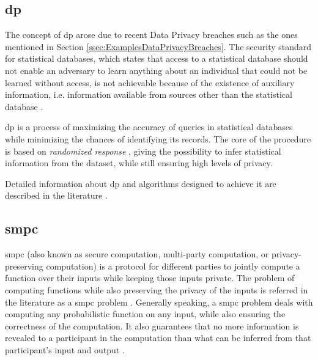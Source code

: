 \subsection{\acl{dp}}
\label{ssec:DifferentialPrivacy}


The concept of \acf{dp} arose due to recent Data Privacy breaches such as the ones mentioned in Section \ref{ssec:ExamplesDataPrivacyBreaches}. The security standard for statistical databases, which states that access to a statistical database should not enable an adversary to learn anything about an individual that could not be learned without access, is not achievable because of the existence of auxiliary information, i.e. information available from sources other than the statistical database \cite{Dwork2006}.

\ac{dp} is a process of maximizing the accuracy of queries in statistical databases while minimizing the chances of identifying its records. The core of the procedure is based on \textit{randomized response} \cite{warner1965randomized}, giving the possibility to infer statistical information from the dataset, while still ensuring high levels of privacy.

Detailed information about \ac{dp} and algorithms designed to achieve it are described in the literature \cite{dwork2014algorithmic}.


\subsection{\acl{smpc}} 
\label{ssec:SecureMultiPartyComputation}


\acf{smpc} (also known as secure computation, multi-party computation, or privacy-preserving computation) is a protocol for different parties to jointly compute a function over their inputs while keeping those inputs private. The problem of computing functions while also preserving the privacy of the inputs is referred in the literature as a \ac{smpc} problem \cite{yao1982protocols}. Generally speaking, a \ac{smpc} problem deals with computing any probabilistic function on any input, while also ensuring the correctness of the computation. It also guarantees that no more information is revealed to a participant in the computation than what can be inferred from that participant's input and output \cite{goldwasser1997multi}. 

